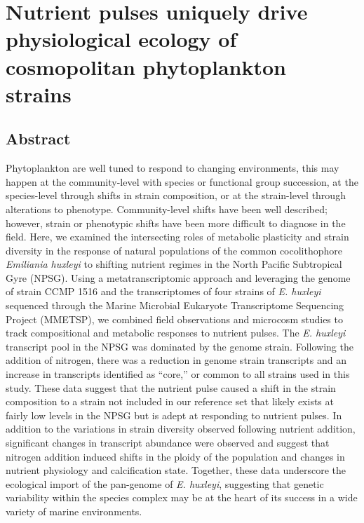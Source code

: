 
\chapter{Nutrient pulses uniquely drive physiological ecology of cosmopolitan phytoplankton strains}
\raggedbottom






\clearpage





\section{Abstract}
Phytoplankton are well tuned to respond to changing environments, this may happen at the community-level with species or functional group succession, at the species-level through shifts in strain composition, or at the strain-level through alterations to phenotype. Community-level shifts have been well described; however, strain or phenotypic shifts have been more difficult to diagnose in the field. Here, we examined the intersecting roles of metabolic plasticity and strain diversity in the response of natural populations of the common cocolithophore \textit{Emiliania huxleyi} to shifting nutrient regimes in the North Pacific Subtropical Gyre (NPSG). Using a metatranscriptomic approach and leveraging the genome of strain CCMP 1516 and the transcriptomes of four strains of \textit{E. huxleyi} sequenced through the Marine Microbial Eukaryote Transcriptome Sequencing Project (MMETSP), we combined field observations and microcosm studies to track compositional and metabolic responses to nutrient pulses. The \textit{E. huxleyi} transcript pool in the NPSG was dominated by the genome strain. Following the addition of nitrogen, there was a reduction in genome strain transcripts and an increase in transcripts identified as “core,” or common to all strains used in this study. These data suggest that the nutrient pulse caused a shift in the strain composition to a strain not included in our reference set that likely exists at fairly low levels in the NPSG but is adept at responding to nutrient pulses. In addition to the variations in strain diversity observed following nutrient addition, significant changes in transcript abundance were observed and suggest that nitrogen addition induced shifts in the ploidy of the population and changes in nutrient physiology and calcification state. Together, these data underscore the ecological import of the pan-genome of \textit{E. huxleyi}, suggesting that genetic variability within the species complex may be at the heart of its success in a wide variety of marine environments.  
